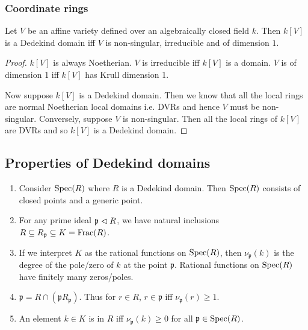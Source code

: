 \documentclass{memoir}
\begin{document}
\subsubsection{Coordinate rings}
\begin{thm}
    Let $V$ be an affine variety defined over an algebraically closed field $k$.
    Then $k[V]$ is a Dedekind domain iff $V$ is non-singular, irreducible and of dimension $1$.
\end{thm}
\begin{proof}
    $k[V]$ is always Noetherian.
    $V$ is irreducible iff $k[V]$ is a domain.
    $V$ is of dimension 1 iff $k[V]$ has Krull dimension 1.

    Now suppose $k[V]$ is a Dedekind domain. Then we know that all the local rings are normal Noetherian local domains  i.e. DVRs and hence $V$ must be non-singular.
    Conversely, suppose $V$ is non-singular. Then all the local rings of $k[V]$ are DVRs and so $k[V]$ is a Dedekind domain.
\end{proof}
\subsection{Properties of Dedekind domains}
\begin{enumerate}
    \item Consider $\operatorname{Spec}(R)$ where $R$ is a Dedekind domain.
    Then $\operatorname{Spec}(R)$ consists of closed points and a generic point.
    \item For any prime ideal $\mathfrak p\vartriangleleft R$, we have natural inclusions $R\subseteq R_{\mathfrak p} \subseteq K = \text{Frac}(R)$.
    \item If we interpret $K$ as the rational functions on $\operatorname{Spec}(R)$, then $\nu_{\mathfrak p}(k)$ is the degree of the pole/zero of $k$ at the point $\mathfrak p$.
        Rational functions on $\operatorname{Spec}(R)$ have finitely many zeros/poles.
    \item $\mathfrak p = R\cap (\mathfrak p R_{\mathfrak p})$.
    Thus for $r\in R$, $r\in \mathfrak p$ iff $\nu_{\mathfrak p}(r)\ge 1$.
    \item An element $k\in K$ is in $R$ iff $\nu_{\mathfrak p}(k)\ge 0$ for all $\mathfrak p\in\operatorname{Spec}(R)$.
\end{enumerate}
\end{document}
